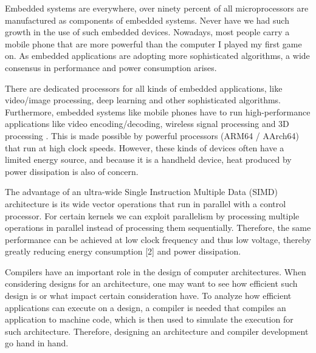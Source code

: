 



Embedded systems are everywhere, over ninety percent of all microprocessors are manufactured as components of embedded systems. %
Never have we had such growth in the use of such embedded devices. Nowadays, most people carry a mobile phone that are more powerful than the computer I played my first game on. As embedded applications are adopting more sophisticated algorithms, a wide consensus in performance and power consumption arises. %

There are dedicated processors for all kinds of embedded applications, like video/image processing, deep learning and other sophisticated algorithms.
Furthermore, embedded systems like mobile phones have to run high-performance applications like video encoding/decoding, wireless signal processing and 3D processing \cite{dongrio1}. This is made possible by powerful processors (ARM64 / AArch64) that run at high clock speeds. However, these kinds of devices often have a limited energy source, and because it is a handheld device, heat produced by power dissipation is also of concern.

The advantage of an ultra-wide Single Instruction Multiple Data (SIMD) architecture is its wide vector operations that run in parallel with a control processor. For certain kernels we can exploit parallelism by processing multiple operations in parallel instead of processing them sequentially. Therefore, the same performance can be achieved at low clock frequency and thus low voltage, thereby greatly reducing energy consumption [2] and power dissipation.%

Compilers have an important role in the design of computer architectures. When considering designs for an architecture, one may want to see how efficient such design is or what impact certain consideration have. To analyze how efficient applications can execute on a design, a compiler is needed that compiles an application to machine code, which is then used to simulate the execution for such architecture. Therefore, designing an architecture and compiler development go hand in hand.  

